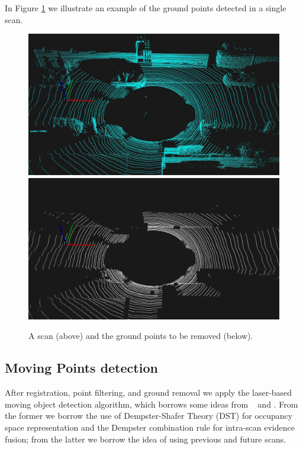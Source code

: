 In Figure \ref{fig:groundremoval} we illustrate an example of the ground points detected in a single scan.



\begin{figure}
\setlength{\tabcolsep}{1pt}
\begin{center}
\includegraphics[width=0.8\columnwidth]{./img/ch-laser/beforeGroundRemoval} \\
\vspace{0.3cm}
\includegraphics[width=0.8\columnwidth]{./img/ch-laser/postGroundRemoval}
\end{center}
\caption{A scan (above) and the ground points to be removed (below).}
\label{fig:groundremoval}
\end{figure}

\subsection{Moving Points detection}
After registration, point filtering, and ground removal we apply the laser-based moving object detection algorithm, which borrows some ideas from ~\cite{xiao2013change} and \cite{vallet2015extracting}. From the former we borrow the use of Dempster-Shafer Theory (DST) for occupancy space representation and the Dempster combination rule for intra-scan evidence fusion; from the latter we borrow the idea of using previous and future scans.

